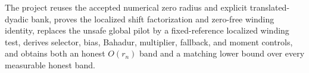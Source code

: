 The project reuses the accepted numerical zero radius and explicit translated-dyadic bank, proves the localized shift factorization and zero-free winding identity, replaces the unsafe global pilot by a fixed-reference localized winding test, derives selector, bias, Bahadur, multiplier, fallback, and moment controls, and obtains both an honest \(O(r_n)\) band and a matching lower bound over every measurable honest band.